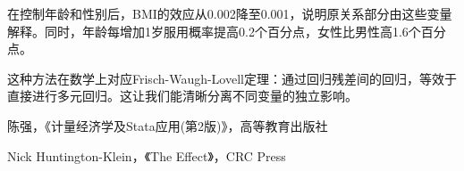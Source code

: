 在控制年龄和性别后，BMI的效应从0.002降至0.001，说明原关系部分由这些变量解释。同时，年龄每增加1岁服用概率提高0.2个百分点，女性比男性高1.6个百分点。

这种方法在数学上对应Frisch-Waugh-Lovell定理：通过回归残差间的回归，等效于直接进行多元回归。这让我们能清晰分离不同变量的独立影响。

\newpage
\thispagestyle{empty}
\begin{thebibliography}{99}
	陈强，《计量经济学及Stata应用(第2版)》，高等教育出版社
	
	Nick Huntington-Klein，《The Effect》，CRC Press
	
\end{thebibliography}
